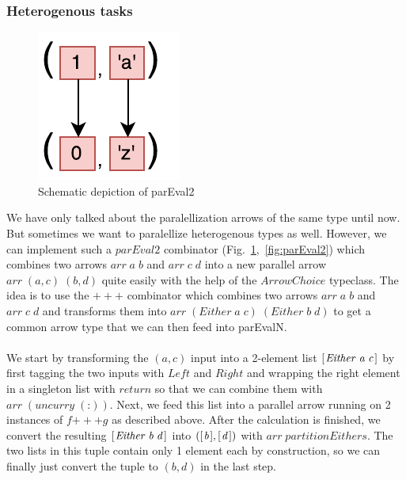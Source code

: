 \documentclass{jfp1}
\newcommand{\Conid}[1]{\mathit{#1}}
\newcommand{\Varid}[1]{\mathit{#1}}
\begin{document}
\subsubsection{Heterogenous tasks}
\begin{figure}[h]
	\includegraphics[scale=0.7]{images/parEval2}
	\caption{Schematic depiction of parEval2}
	\label{fig:parEval2Img}
\end{figure}
We have only talked about the paralellization arrows of the same type until now. But sometimes we want to paralellize heterogenous types as well. However, we can implement such a \ensuremath{\Varid{parEval2}} combinator (Fig.~\ref{fig:parEval2Img},~\ref{fig:parEval2}) which combines two arrows \ensuremath{\Varid{arr}\;\Varid{a}\;\Varid{b}} and \ensuremath{\Varid{arr}\;\Varid{c}\;\Varid{d}} into a new parallel arrow \ensuremath{\Varid{arr}\;(\Varid{a},\Varid{c})\;(\Varid{b},\Varid{d})} quite easily with the help of the \ensuremath{\Conid{ArrowChoice}} typeclass. The idea is to use the \ensuremath{\mathbin{+++}} combinator which combines two arrows \ensuremath{\Varid{arr}\;\Varid{a}\;\Varid{b}} and \ensuremath{\Varid{arr}\;\Varid{c}\;\Varid{d}} and transforms them into \ensuremath{\Varid{arr}\;(\Conid{Either}\;\Varid{a}\;\Varid{c})\;(\Conid{Either}\;\Varid{b}\;\Varid{d})} to get a common arrow type that we can then feed into parEvalN.
\\\\
We start by transforming the \ensuremath{(\Varid{a},\Varid{c})} input into a 2-element list \ensuremath{[\mskip1.5mu \Conid{Either}\;\Varid{a}\;\Varid{c}\mskip1.5mu]} by first tagging the two inputs with \ensuremath{\Conid{Left}} and \ensuremath{\Conid{Right}} and wrapping the right element in a singleton list with \ensuremath{\Varid{return}} so that we can combine them with \ensuremath{\Varid{arr}\;(\Varid{uncurry}\;(\mathbin{:}))}. Next, we feed this list into a parallel arrow running on 2 instances of \ensuremath{\Varid{f}\mathbin{+++}\Varid{g}} as described above. After the calculation is finished, we convert the resulting \ensuremath{[\mskip1.5mu \Conid{Either}\;\Varid{b}\;\Varid{d}\mskip1.5mu]} into \ensuremath{([\mskip1.5mu \Varid{b}\mskip1.5mu],[\mskip1.5mu \Varid{d}\mskip1.5mu])} with \ensuremath{\Varid{arr}\;\Varid{partitionEithers}}. The two lists in this tuple contain only 1 element each by construction, so we can finally just convert the tuple to \ensuremath{(\Varid{b},\Varid{d})} in the last step.
\end{document}
